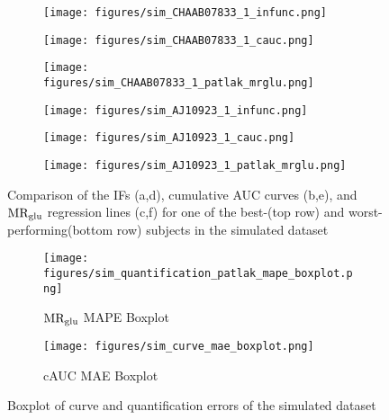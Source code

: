\begin{figure}[h]
	\centering
	\begin{subfigure}[b]{0.322\textwidth}
		\texttt{[image: figures/sim\_CHAAB07833\_1\_infunc.png]}
		\caption{}
	\end{subfigure}
	\begin{subfigure}[b]{0.322\textwidth}
		\texttt{[image: figures/sim\_CHAAB07833\_1\_cauc.png]}
		\caption{}
	\end{subfigure}
	\begin{subfigure}[b]{0.322\textwidth}
		\texttt{[image: figures/sim\_CHAAB07833\_1\_patlak\_mrglu.png]}
		\caption{}
	\end{subfigure}
	\begin{subfigure}[b]{0.322\textwidth}
		\texttt{[image: figures/sim\_AJ10923\_1\_infunc.png]}
		\caption{}
	\end{subfigure}
	\begin{subfigure}[b]{0.322\textwidth}
		\texttt{[image: figures/sim\_AJ10923\_1\_cauc.png]}
		\caption{}
	\end{subfigure}
	\begin{subfigure}[b]{0.322\textwidth}
		\texttt{[image: figures/sim\_AJ10923\_1\_patlak\_mrglu.png]}
		\caption{}
	\end{subfigure}
	\caption{Comparison of the IFs (a,d), cumulative AUC curves (b,e), and $\text{MR}_{\text{glu}}$ regression lines (c,f) for one of the best-(top row) and worst-performing(bottom row) subjects in the simulated dataset}
	\label{fig:sim_ifs}
\end{figure}

\begin{figure}[h]
	\centering
	\begin{subfigure}[b]{0.45\textwidth}
		\texttt{[image: figures/sim\_quantification\_patlak\_mape\_boxplot.png]}
		\caption{\(\text{MR}_{\text{glu}}\) MAPE Boxplot}
		\label{subfig:sim_mape_boxplot}
	\end{subfigure}
	\begin{subfigure}[b]{0.45\textwidth}
		\texttt{[image: figures/sim\_curve\_mae\_boxplot.png]}
		\caption{cAUC MAE Boxplot}
		\label{subfig:sim_cauc_boxplot}
	\end{subfigure}
	\caption{Boxplot of curve and quantification errors of the simulated dataset}
	\label{fig:sim_boxplots}
\end{figure}


